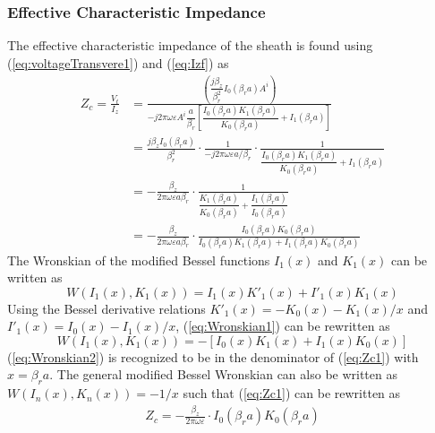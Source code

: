 \subsubsection{Effective Characteristic Impedance}
The effective characteristic impedance of the sheath is found using (\ref{eq:voltageTransvere1}) and (\ref{eq:Izf}) as
\begin{equation}\label{eq:Zc1}
	\begin{split}
		Z_c = \frac{V_t}{I_z} 
		&= \frac{\left( \dfrac{j \beta_z}{\beta_r^2} I_0(\beta_r a) A^i \right)}
		{ -j 2\pi \omega \varepsilon A^i \dfrac{a}{\beta_r} 
			\left[ \dfrac{I_0(\beta_r a) K_1(\beta_r a)}{K_0(\beta_r a)} + I_1(\beta_r a) \right] } \\
		&= \frac{j \beta_z I_0(\beta_r a)}{\beta_r^2}
		\cdot \frac{1}{-j 2\pi \omega \varepsilon a / \beta_r}
		\cdot \frac{1}
		{ \dfrac{I_0(\beta_r a) K_1(\beta_r a)}{K_0(\beta_r a)} + I_1(\beta_r a) } \\
		&= -\frac{\beta_z}{2\pi \omega \varepsilon a \beta_r}
		\cdot \frac{1}
		{ \dfrac{K_1(\beta_r a)}{K_0(\beta_r a)} + \dfrac{I_1(\beta_r a)}{I_0(\beta_r a)} } \\
		&= -\frac{\beta_z}{2\pi \omega \varepsilon a \beta_r}
		\cdot \frac{I_0(\beta_r a) K_0(\beta_r a)}
		{I_0(\beta_r a) K_1(\beta_r a) + I_1(\beta_r a) K_0(\beta_r a)}
	\end{split}
\end{equation}
The Wronskian of the modified Bessel functions $I_1(x)$ and $K_1(x)$ can be written as 
\begin{equation}\label{eq:Wronskian1}
	W(I_1(x), K_1(x)) = I_{1}(x)K'_{1}(x) + I'_{1}(x)K_{1}(x)
\end{equation}
Using the Bessel derivative relations $K'_{1}(x) = -K_{0}(x) - K_{1}(x)/x$ and $I'_{1}(x) = I_{0}(x) - I_{1}(x)/x$, (\ref{eq:Wronskian1}) can be rewritten as
\begin{equation}\label{eq:Wronskian2}
	W(I_1(x), K_1(x)) = -[I_{0}(x)K_{1}(x) + I_{1}(x)K_{0}(x)]
\end{equation}
(\ref{eq:Wronskian2}) is recognized to be in the denominator of (\ref{eq:Zc1}) with $x=\beta_r a$. The general modified Bessel Wronskian can also be written as $W(I_n(x), K_n(x))=-1/x$ such that (\ref{eq:Zc1}) can be rewritten as
\begin{equation}\label{eq:Zc2}
	\begin{split}
		Z_c = -\frac{\beta_z}{2\pi \omega \varepsilon}
		\cdot I_0(\beta_r a) K_0(\beta_r a)
	\end{split}
\end{equation}
